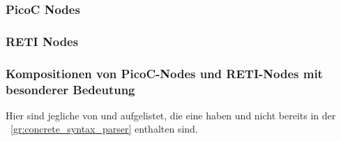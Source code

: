 \subsubsection{PicoC Nodes}
\subsubsection{RETI Nodes}

\subsubsection{Kompositionen von PicoC-Nodes und RETI-Nodes mit besonderer Bedeutung}
Hier sind jegliche  von  und  aufgelistet, die eine  haben und nicht bereits in der ~\ref{gr:concrete_syntax_parser} enthalten sind.

